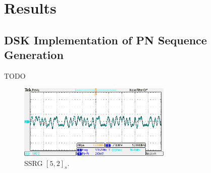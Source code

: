 \documentclass{article}
\begin{document}

\section{Results}

\subsection{DSK Implementation of PN Sequence Generation}

TODO 

\begin{figure}[h]
  \begin{center}
    \includegraphics[width=0.65\textwidth]{img/periodic_pseudo_sequence}
    \caption{SSRG $[5,2]_s$.}
  \end{center}
\end{figure}

\end{document}
